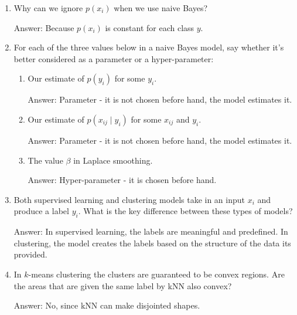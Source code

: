 \documentclass{article}
\newenvironment{answer}{\par\begingroup\color{gre}Answer: }{\endgroup}
\begin{document}
\begin{enumerate}
        \item Why can we ignore $p(x_i)$ when we use naive Bayes?
        \begin{answer}
            Because $p(x_i)$ is constant for each class $y$.
        \end{answer}

        \item For each of the three values below in a naive Bayes model, say whether it's better considered as a parameter or a hyper-parameter:
        \begin{enumerate}
            \item Our estimate of $p(y_i)$ for some $y_i$. \begin{answer}
                Parameter - it is not chosen before hand, the model estimates it.
            \end{answer}
            \item Our estimate of $p(x_{ij} \mid y_i)$ for some $x_{ij}$ and $y_i$. \begin{answer}
                Parameter - it is not chosen before hand, the model estimates it.
            \end{answer}
            \item The value $\beta$ in Laplace smoothing. \begin{answer}
                Hyper-parameter - it is chosen before hand.
            \end{answer}
        \end{enumerate}

        \item Both supervised learning and clustering models take in an input $x_i$ and produce a label $y_i$. What is the key difference between these types of models?
        \begin{answer}
            In supervised learning, the labels are meaningful and predefined. In clustering, the model creates the labels based on the structure of the data its provided.
        \end{answer}

        \item In $k$-means clustering the clusters are guaranteed to be convex regions. Are the areas that are given the same label by kNN also convex?
        \begin{answer}
            No, since kNN can make disjointed shapes.
        \end{answer}
    \end{enumerate}
\end{document}
